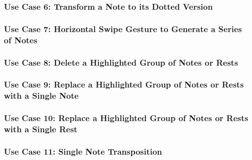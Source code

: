   \subsubsection{Use Case 6: Transform a Note to its Dotted Version}


  \subsubsection{Use Case 7: Horizontal Swipe Gesture to Generate a Series of Notes}


  \subsubsection{Use Case 8: Delete a Highlighted Group of Notes or Rests}


  \subsubsection{Use Case 9: Replace a Highlighted Group of Notes or Rests with a Single Note}


  \subsubsection{Use Case 10: Replace a Highlighted Group of Notes or Rests with a Single Rest}



  \subsubsection{Use Case 11: Single Note Transposition}

